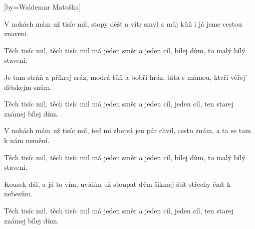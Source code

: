 [by={Waldemar Matuška}]

\beginverse{}
V nohách mám už tisíc mil,
stopy déšť a vítr smyl
a můj kůň i já jsme cestou znaveni.
\endverse{}

\beginchorus{}
Těch tisíc mil, těch tisíc mil
má jeden směr a jeden cíl,
bílej dům, to malý bílý stavení.
\endchorus{}

\beginverse{}
Je tam stráň a příkrej sráz,
modrá tůň a bobří hráz,
táta s mámou, kteří věřej' dětskejm snům.
\endverse{}

\beginchorus{}
Těch tisíc mil, těch tisíc mil
má jeden směr a jeden cíl,
jeden cíl, ten starej známej bílej dům.
\endchorus{}

\beginverse{}
V nohách mám už tisíc mil,
teď mi zbejvá jen pár chvil,
cestu znám, a ta se tam k nám nemění.
\endverse{}

\beginchorus{}
Těch tisíc mil, těch tisíc mil
má jeden směr a jeden cíl,
bílej dům, to malý bílý stavení.
\endchorus{}

\beginverse{}
Kousek dál, a já to vím,
uvidím už stoupat dým
šikmej štít střechy čnít k nebesům.
\endverse{}

\beginchorus{}
Těch tisíc mil, těch tisíc mil
má jeden směr a jeden cíl,
jeden cíl, ten starej známej bílej dům.
\endchorus{}

\endsong{}
